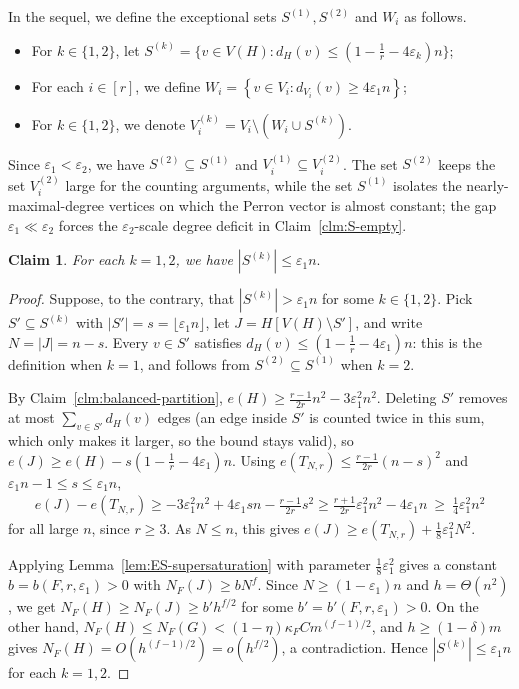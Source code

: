 \documentclass[11pt,a4paper]{article}
\newtheorem{claim}[theorem]{Claim}
\theoremstyle{definition}
\theoremstyle{plain}
\newcommand{\eps}{\varepsilon}
\renewcommand{\le}{\leqslant}
\renewcommand{\ge}{\geqslant}
\begin{document}
In the sequel, we define the exceptional sets 
$S^{(1)},S^{(2)}$ and $W_i$ as follows. 
\begin{itemize}
\item 
For $k\in\{1,2\}$, let $  S^{(k)}=
  \{
  v\in V(H):
  d_H(v)\le \left(1-\frac1r-4\eps_k\right)n \}$; 
  
  \item 
For each $i\in[r]$, we define $ W_i=
  \left\{
  v\in V_i:
  d_{V_i}(v)\ge 4\eps_1n
  \right\}$; 
  
  \item 
  For $k\in\{1,2\}$, we denote 
$  V_i^{(k)}=V_i\setminus(W_i\cup S^{(k)})$. 
  \end{itemize}
Since $\eps_1<\eps_2$, we have $S^{(2)}\subseteq S^{(1)}$ and $V_i^{(1)}\subseteq V_i^{(2)}$. 
The set $S^{(2)}$ keeps
the set $V_i^{(2)}$ large for the counting arguments, while the set $S^{(1)}$ isolates
the nearly-maximal-degree vertices on which the Perron vector is almost constant; the gap
$\eps_1\ll\eps_2$ forces the $\eps_2$-scale degree deficit in Claim~\ref{clm:S-empty}. 

\begin{claim}\label{clm:S-small}
For each $k=1,2$, we have  $  |S^{(k)}|\le \eps_1n.$
\end{claim}


\begin{proof}
Suppose, to the contrary, that $|S^{(k)}|>\eps_1n$ for some $k\in\{1,2\}$. Pick
$S'\subseteq S^{(k)}$ with $|S'|=s=\lfloor\eps_1n\rfloor$, let $J=H[V(H)\setminus S']$, and write
$N=|J|=n-s$. Every $v\in S'$ satisfies $d_H(v)\le(1-\frac1r-4\eps_1)n$: this is the definition
when $k=1$, and follows from $S^{(2)}\subseteq S^{(1)}$ when $k=2$.

By Claim~\ref{clm:balanced-partition}, $e(H)\ge\frac{r-1}{2r}n^2-3\eps_1^2n^2$. Deleting $S'$
removes at most $\sum_{v\in S'}d_H(v)$ edges (an edge inside $S'$ is counted twice in this sum,
which only makes it larger, so the bound stays valid), so
$e(J)\ge e(H)-s(1-\frac1r-4\eps_1)n$. Using $e(T_{N,r})\le\frac{r-1}{2r}(n-s)^2$ and
$\eps_1n-1\le s\le\eps_1n$,
\[
\begin{aligned}
  e(J)-e(T_{N,r})
  \ge -3\eps_1^2n^2+4\eps_1sn-\tfrac{r-1}{2r}s^2 
  \ge \tfrac{r+1}{2r}\eps_1^2n^2-4\eps_1n
  \ \ge\ \tfrac14\eps_1^2n^2
\end{aligned}
\]
for all large $n$, since $r\ge3$. As $N\le n$, this gives $e(J)\ge e(T_{N,r})+\frac18\eps_1^2N^2$.

Applying Lemma~\ref{lem:ES-supersaturation} with parameter $\frac18\eps_1^2$ gives a constant
$b=b(F,r,\eps_1)>0$ with $N_F(J)\ge bN^f$. Since $N\ge(1-\eps_1)n$ and $h=\Theta(n^2)$, we get
$N_F(H)\ge N_F(J)\ge b'h^{f/2}$ for some $b'=b'(F,r,\eps_1)>0$. On the other hand,
$N_F(H)\le  N_F (G)<(1-\eta)\kappa_FCm^{(f-1)/2}$, and $h\ge(1-\delta)m$ gives
$ N_F (H)=O(h^{(f-1)/2})=o(h^{f/2})$, a contradiction. Hence
$|S^{(k)}|\le\eps_1n$ for each $k=1,2$.
\end{proof}
\end{document}

